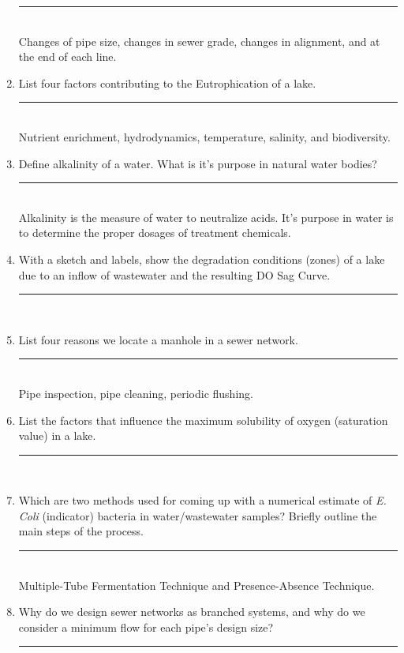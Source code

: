 \documentclass{article}
\begin{document}
\begin{enumerate}
    \rule{5cm}{1pt}\\
    Changes of pipe size, changes in sewer grade, changes in alignment, and at the end of each line.
    \item List four factors contributing to the Eutrophication of a lake.\\
    \rule{5cm}{1pt}\\
    Nutrient enrichment, hydrodynamics, temperature, salinity, and biodiversity.
    \item Define alkalinity of a water. What is it's purpose in natural water bodies?\\
    \rule{5cm}{1pt}\\
    Alkalinity is the measure of water to neutralize acids. It's purpose in water is to determine the proper dosages of treatment chemicals.
    \item With a sketch and labels, show the degradation conditions (zones) of a lake due to an inflow of wastewater and the resulting DO Sag Curve.\\
    \rule{5cm}{1pt}\\
    \item List four reasons we locate a manhole in a sewer network.\\
    \rule{5cm}{1pt}\\
    Pipe inspection, pipe cleaning, periodic flushing.
    \item List the factors that influence the maximum solubility of oxygen (saturation value) in a lake.\\
    \rule{5cm}{1pt}\\
    \item Which are two methods used for coming up with a numerical estimate of \emph{E. Coli} (indicator) bacteria in water/wastewater samples? Briefly outline the main steps of the process.\\
    \rule{5cm}{1pt}\\
    Multiple-Tube Fermentation Technique and Presence-Absence Technique.
    \item Why do we design sewer networks as branched systems, and why do we consider a minimum flow for each pipe's design size?\\
    \rule{5cm}{1pt}\\
\end{enumerate}
\end{document}

